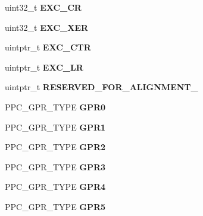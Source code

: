 \begin{DoxyCompactItemize}
uint32\+\_\+t {\bfseries E\+X\+C\+\_\+\+CR}
\item 
\mbox{\label{structCPU__Exception__frame_a4d321307bf63cd7e59883bb3651b26df}} 
uint32\+\_\+t {\bfseries E\+X\+C\+\_\+\+X\+ER}
\item 
\mbox{\label{structCPU__Exception__frame_a3c9bcd9f72f37f372e00e3a771532587}} 
uintptr\+\_\+t {\bfseries E\+X\+C\+\_\+\+C\+TR}
\item 
\mbox{\label{structCPU__Exception__frame_ae402313e1a18d5c2e9513e752c81712d}} 
uintptr\+\_\+t {\bfseries E\+X\+C\+\_\+\+LR}
\item 
\mbox{\label{structCPU__Exception__frame_a8d673e1b9368e4a280bc1db833ff8938}} 
uintptr\+\_\+t {\bfseries R\+E\+S\+E\+R\+V\+E\+D\+\_\+\+F\+O\+R\+\_\+\+A\+L\+I\+G\+N\+M\+E\+N\+T\+\_}
\item 
\mbox{\label{structCPU__Exception__frame_a51b1b1a175c78cad5ca7c71ecb2505f9}} 
P\+P\+C\+\_\+\+G\+P\+R\+\_\+\+T\+Y\+PE {\bfseries G\+P\+R0}
\item 
\mbox{\label{structCPU__Exception__frame_a654c90ea791a9f18bce6f43f2c46cd4d}} 
P\+P\+C\+\_\+\+G\+P\+R\+\_\+\+T\+Y\+PE {\bfseries G\+P\+R1}
\item 
\mbox{\label{structCPU__Exception__frame_a15a61d073220c131fbaff5a6228d7133}} 
P\+P\+C\+\_\+\+G\+P\+R\+\_\+\+T\+Y\+PE {\bfseries G\+P\+R2}
\item 
\mbox{\label{structCPU__Exception__frame_af5d4105bbb9812806afee00a96acb089}} 
P\+P\+C\+\_\+\+G\+P\+R\+\_\+\+T\+Y\+PE {\bfseries G\+P\+R3}
\item 
\mbox{\label{structCPU__Exception__frame_a004da613ded489df2f2a6aec70ab82ec}} 
P\+P\+C\+\_\+\+G\+P\+R\+\_\+\+T\+Y\+PE {\bfseries G\+P\+R4}
\item 
\mbox{\label{structCPU__Exception__frame_a31c173e8a976d4028d2956faa23b4af4}} 
P\+P\+C\+\_\+\+G\+P\+R\+\_\+\+T\+Y\+PE {\bfseries G\+P\+R5}

\end{DoxyCompactItemize}
